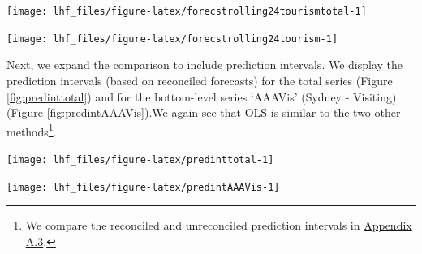 \documentclass[11pt,a4paper,]{article}
\let\origfigure\figure
\let\endorigfigure\endfigure
\renewenvironment{figure}[1][2] {
    \expandafter\origfigure\expandafter[!htbp]
} {
    \endorigfigure
}
\begin{document}
\begin{figure}

{\centering \texttt{[image: lhf\_files/figure-latex/forecstrolling24tourismtotal-1]} 

}

\caption{Comparing ETS, ARIMA and OLS forecasts (reconciled and unreconciled) for `Total' series. (Top: rolling origin, Bottom: fixed origin).}\label{fig:forecstrolling24tourismtotal}
\end{figure}

\begin{figure}

{\centering \texttt{[image: lhf\_files/figure-latex/forecstrolling24tourism-1]} 

}

\caption{Comparing ETS, ARIMA and OLS forecasts (reconciled and unreconciled) for `AAAVis' bottom-level series. (Top: rolling origin, Bottom: fixed origin).}\label{fig:forecstrolling24tourism}
\end{figure}

Next, we expand the comparison to include prediction intervals. We display the prediction intervals (based on reconciled forecasts) for the total series (Figure \ref{fig:predinttotal}) and for the bottom-level series `AAAVis' (Sydney - Visiting) (Figure \ref{fig:predintAAAVis}).We again see that OLS is similar to the two other methods\footnote{We compare the reconciled and unreconciled prediction intervals in \protect\hyperlink{appendixA.3}{Appendix A.3}.}.

\begin{figure}

{\centering \texttt{[image: lhf\_files/figure-latex/predinttotal-1]} 

}

\caption{Comparing ETS, ARIMA and OLS reconciled forecasts and prediction intervals for `Total' series. (Top: rolling origin, Bottom: fixed origin).}\label{fig:predinttotal}
\end{figure}

\begin{figure}

{\centering \texttt{[image: lhf\_files/figure-latex/predintAAAVis-1]} 

}

\caption{Comparing ETS, ARIMA and OLS reconciled forecasts and prediction intervals for `AAAVis' bottom-level series. (Top: rolling origin, Bottom: fixed origin).}\label{fig:predintAAAVis}
\end{figure}
\end{document}
